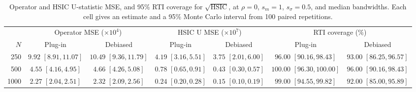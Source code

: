 \begin{table}[htbp]
\centering\small
\caption{Operator and HSIC U-statistic MSE, and 95\% RTI coverage for $\sqrt{\mathrm{HSIC}}$, at $\rho=0$, $s_m=1$, $s_\sigma=0.5$, and median bandwidths. Each cell gives an estimate and a 95\% Monte Carlo interval from 100 paired repetitions.}
\label{tab:debiasing-mse-rho0}
\setlength{\tabcolsep}{4pt}\renewcommand{\arraystretch}{1.3}
\begin{tabular}{@{}rcccccc@{}}\toprule
& \multicolumn{2}{c}{Operator MSE ($\times 10^{4}$)} & \multicolumn{2}{c}{HSIC U MSE ($\times 10^{7}$)} & \multicolumn{2}{c}{RTI coverage (\%)}\\
\cmidrule(lr){2-3}\cmidrule(lr){4-5}\cmidrule(l){6-7}
$N$ & Plug-in & Debiased & Plug-in & Debiased & Plug-in & Debiased\\\midrule
250 & \shortstack{$9.92$\\{\scriptsize $[8.91,11.07]$}} & \shortstack{$10.49$\\{\scriptsize $[9.36,11.79]$}} & \shortstack{$4.19$\\{\scriptsize $[3.16,5.51]$}} & \shortstack{$3.75$\\{\scriptsize $[2.01,6.00]$}} & \shortstack{$96.00$\\{\scriptsize $[90.16,98.43]$}} & \shortstack{$93.00$\\{\scriptsize $[86.25,96.57]$}}\\[3pt]
500 & \shortstack{$4.55$\\{\scriptsize $[4.16,4.95]$}} & \shortstack{$4.66$\\{\scriptsize $[4.26,5.08]$}} & \shortstack{$0.78$\\{\scriptsize $[0.65,0.91]$}} & \shortstack{$0.43$\\{\scriptsize $[0.30,0.57]$}} & \shortstack{$100.00$\\{\scriptsize $[96.30,100.00]$}} & \shortstack{$96.00$\\{\scriptsize $[90.16,98.43]$}}\\[3pt]
1000 & \shortstack{$2.27$\\{\scriptsize $[2.04,2.51]$}} & \shortstack{$2.32$\\{\scriptsize $[2.09,2.56]$}} & \shortstack{$0.24$\\{\scriptsize $[0.20,0.28]$}} & \shortstack{$0.15$\\{\scriptsize $[0.10,0.19]$}} & \shortstack{$99.00$\\{\scriptsize $[94.55,99.82]$}} & \shortstack{$92.00$\\{\scriptsize $[85.00,95.89]$}}\\[3pt]
\bottomrule\end{tabular}
\end{table}
